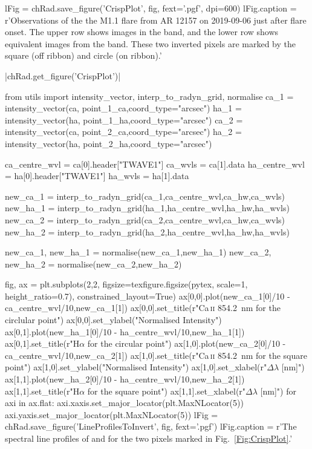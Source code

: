 \begin{pycode}[Radynversion]
lFig = chRad.save_figure('CrispPlot', fig, fext='.pgf', dpi=600)
lFig.caption = r'Observations of the the M1.1 flare from AR 12157 on 2019-09-06 just after flare onset. The upper row shows images in the \CaLine{} band, and the lower row shows equivalent images from the \Ha{} band. These two inverted pixels are marked by the square (off ribbon) and circle (on ribbon).'
\end{pycode}

\py[Radynversion]|chRad.get_figure('CrispPlot')|

\begin{pycode}[Radynversion]
from utils import intensity_vector, interp_to_radyn_grid, normalise
ca_1 = intensity_vector(ca, point_1_ca,coord_type="arcsec")
ha_1 = intensity_vector(ha, point_1_ha,coord_type="arcsec")
ca_2 = intensity_vector(ca, point_2_ca,coord_type="arcsec")
ha_2 = intensity_vector(ha, point_2_ha,coord_type="arcsec")

ca_centre_wvl = ca[0].header["TWAVE1"]
ca_wvls = ca[1].data
ha_centre_wvl = ha[0].header["TWAVE1"]
ha_wvls = ha[1].data

new_ca_1 = interp_to_radyn_grid(ca_1,ca_centre_wvl,ca_hw,ca_wvls)
new_ha_1 = interp_to_radyn_grid(ha_1,ha_centre_wvl,ha_hw,ha_wvls)
new_ca_2 = interp_to_radyn_grid(ca_2,ca_centre_wvl,ca_hw,ca_wvls)
new_ha_2 = interp_to_radyn_grid(ha_2,ha_centre_wvl,ha_hw,ha_wvls)

new_ca_1, new_ha_1 = normalise(new_ca_1,new_ha_1)
new_ca_2, new_ha_2 = normalise(new_ca_2,new_ha_2)

fig, ax = plt.subplots(2,2,
figsize=texfigure.figsize(pytex, scale=1, height_ratio=0.7),
constrained_layout=True)
ax[0,0].plot(new_ca_1[0]/10 - ca_centre_wvl/10,new_ca_1[1])
ax[0,0].set_title(r"Ca\,\textsc{ii} \SI{854.2}{\nano\metre} for the circlular point")
ax[0,0].set_ylabel("Normalised Intensity")
ax[0,1].plot(new_ha_1[0]/10 - ha_centre_wvl/10,new_ha_1[1])
ax[0,1].set_title(r"H$\alpha$ for the circular point")
ax[1,0].plot(new_ca_2[0]/10 - ca_centre_wvl/10,new_ca_2[1])
ax[1,0].set_title(r"Ca\,\textsc{ii} \SI{854.2}{\nano\metre} for the square point")
ax[1,0].set_ylabel("Normalised Intensity")
ax[1,0].set_xlabel(r"$\Delta\lambda$ [nm]")
ax[1,1].plot(new_ha_2[0]/10 - ha_centre_wvl/10,new_ha_2[1])
ax[1,1].set_title(r"H$\alpha$ for the square point")
ax[1,1].set_xlabel(r"$\Delta\lambda$ [nm]")
for axi in ax.flat:
    axi.xaxis.set_major_locator(plt.MaxNLocator(5))
    axi.yaxis.set_major_locator(plt.MaxNLocator(5))
lFig = chRad.save_figure('LineProfilesToInvert', fig, fext='.pgf')
lFig.caption = r'The spectral line profiles of \CaLine{} and \Ha{} for the two pixels marked in Fig.~\ref{Fig:CrispPlot}.'
\end{pycode}


